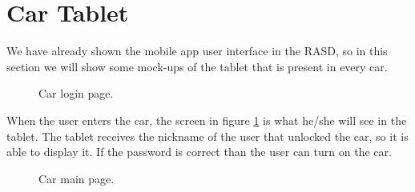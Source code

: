 \section{Car Tablet}
We have already shown the mobile app user interface in the RASD, so in this section we will show some mock-ups of the tablet that is present in every car.

\begin{figure}
    \vspace*{-2cm}
    \caption{Car login page.}
	\label{fig:car_login}
\end{figure}

When the user enters the car, the screen in figure \ref{fig:car_login} is what he/she will see in the tablet. The tablet receives the nickname of the user that unlocked the car, so it is able to display it. If the password is correct than the user can turn on the car.

\begin{figure}
    \vspace*{-2cm}
    \caption{Car main page.}
	\label{fig:car_main}
\end{figure}

